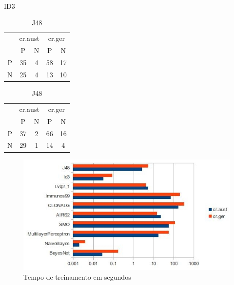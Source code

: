 \begin{table}
    \parbox{.45\linewidth}{
        \centering
        \caption{ID3}
        \begin{tabular}{c|c c|c c}
            \multicolumn{1}{c}{}  & \multicolumn{2}{c}{cr.aust} & \multicolumn{2}{c}{cr.ger} \\
            \multirow{1}{2.5mm}{} & P & N & P & N \\
            \hline
            P & 35 & 4 & 58 & 17 \\
            N & 25 & 4 & 13 & 10 \\
        \end{tabular}
    }
    \hfill
    \parbox{.45\linewidth}{
        \centering
        \caption{J48}
        \begin{tabular}{c|c c|c c}
            \multicolumn{1}{c}{}  & \multicolumn{2}{c}{cr.aust} & \multicolumn{2}{c}{cr.ger} \\
            \multirow{1}{2.5mm}{} & P & N & P & N \\
            \hline
            P & 37 & 2 & 66 & 16 \\
            N & 29 & 1 & 14 &  4 \\
        \end{tabular}
    }
\end{table}

\begin{figure}[h]
    \centering
    \caption{Tempo de treinamento em segundos}
    \label{fig:dev_graph_train_time}
    \includegraphics[width=1\textwidth]{img/graph_train_time.jpg}
\end{figure}

